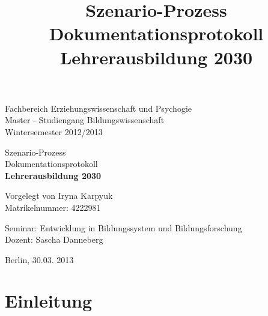 \documentclass[12pt,a4paper]{article}
\author{}
\title{ Szenario-Prozess\\ Dokumentationsprotokoll\\ \textbf{Lehrerausbildung 2030} }
\begin{document}
\begin{titlepage}

\normalsize

\begin{flushleft}
Fachbereich Erziehungswissenschaft und Psychogie \\
Master - Studiengang Bildungswissenschaft \\
Wintersemester 2012/2013 \\
\end{flushleft}

\vspace{120pt}

\begin{center}
\huge
Szenario-Prozess\\ Dokumentationsprotokoll\\ \textbf{Lehrerausbildung 2030}
\vspace{60pt}
                         
\normalsize                               
Vorgelegt von Iryna Karpyuk\\
Matrikelnummer: 4222981
\end{center}                  
           
\begin{flushleft}
\normalsize
\vspace{100pt}

Seminar: Entwicklung in Bildungssystem und Bildungsforschung\\ 
Dozent: Sascha Danneberg\\
\vspace{60pt}

Berlin, 30.03. 2013
\end{flushleft}
\end{titlepage}
\normalsize                                              
\pagebreak

\tableofcontents

\pagebreak

\section{Einleitung}
\end{document}
